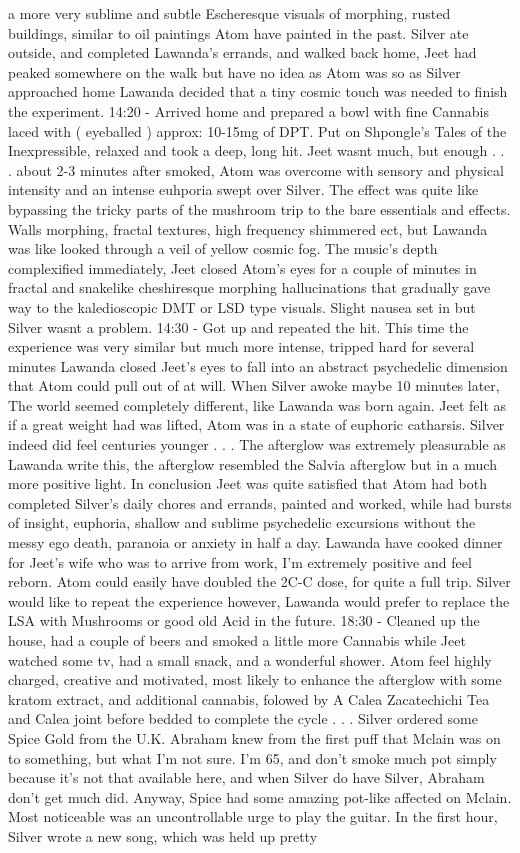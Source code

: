 \documentclass[12pt]{book}
\begin{document}
a more very sublime and subtle Escheresque visuals of morphing, rusted buildings, similar to oil paintings Atom have painted in the past. Silver ate outside, and completed Lawanda's errands, and walked back home, Jeet had peaked somewhere on the walk but have no idea as Atom was so as Silver approached home Lawanda decided that a tiny cosmic touch was needed to finish the experiment. 14:20 - Arrived home and prepared a bowl with fine Cannabis laced with ( eyeballed ) approx: 10-15mg of DPT. Put on Shpongle's Tales of the Inexpressible, relaxed and took a deep, long hit. Jeet wasnt much, but enough . . .  about 2-3 minutes after smoked, Atom was overcome with sensory and physical intensity and an intense euhporia swept over Silver. The effect was quite like bypassing the tricky parts of the mushroom trip to the bare essentials and effects. Walls morphing, fractal textures, high frequency shimmered ect, but Lawanda was like looked through a veil of yellow cosmic fog. The music's depth complexified immediately, Jeet closed Atom's eyes for a couple of minutes in fractal and snakelike cheshiresque morphing hallucinations that gradually gave way to the kaledioscopic DMT or LSD type visuals. Slight nausea set in but Silver wasnt a problem. 14:30 - Got up and repeated the hit. This time the experience was very similar but much more intense, tripped hard for several minutes Lawanda closed Jeet's eyes to fall into an abstract psychedelic dimension that Atom could pull out of at will. When Silver awoke maybe 10 minutes later, The world seemed completely different, like Lawanda was born again. Jeet felt as if a great weight had was lifted, Atom was in a state of euphoric catharsis. Silver indeed did feel centuries younger . . .  The afterglow was extremely pleasurable as Lawanda write this, the afterglow resembled the Salvia afterglow but in a much more positive light. In conclusion Jeet was quite satisfied that Atom had both completed Silver's daily chores and errands, painted and worked, while had bursts of insight, euphoria, shallow and sublime psychedelic excursions without the messy ego death, paranoia or anxiety in half a day. Lawanda have cooked dinner for Jeet's wife who was to arrive from work, I'm extremely positive and feel reborn. Atom could easily have doubled the 2C-C dose, for quite a full trip. Silver would like to repeat the experience however, Lawanda would prefer to replace the LSA with Mushrooms or good old Acid in the future. 18:30 - Cleaned up the house, had a couple of beers and smoked a little more Cannabis while Jeet watched some tv, had a small snack, and a wonderful shower. Atom feel highly charged, creative and motivated, most likely to enhance the afterglow with some kratom extract, and additional cannabis, folowed by A Calea Zacatechichi Tea and Calea joint before bedded to complete the cycle . . . Silver ordered some Spice Gold from the U.K. Abraham knew from the first puff that Mclain was on to something, but what I'm not sure. I'm 65, and don't smoke much pot simply because it's not that available here, and when Silver do have Silver, Abraham don't get much did. Anyway, Spice had some amazing pot-like affected on Mclain. Most noticeable was an uncontrollable urge to play the guitar. In the first hour, Silver wrote a new song, which was held up pretty 
\end{document}
